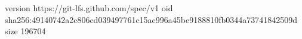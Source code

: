 version https://git-lfs.github.com/spec/v1
oid sha256:49140742a2c806cd039497761c15ac996a45be9188810fb0344a73741842509d
size 196704
